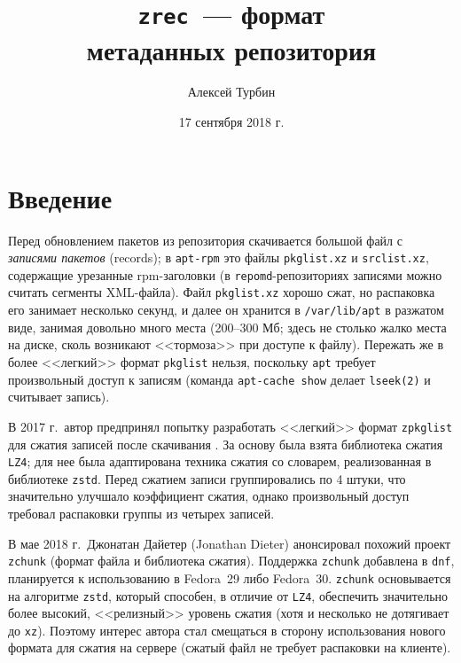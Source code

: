 \documentclass[russian,a4paper,12pt]{article}
\begin{document}
\title{\texttt{zrec}~--- формат\\метаданных репозитория}
\author{Алексей Турбин}
\date{17 сентября 2018 г.}
\maketitle

\begin{abstract}

\end{abstract}

\section{Введение}
Перед обновлением пакетов из репозитория скачивается большой файл с \textit{записями пакетов} (records);
в \verb|apt-rpm| это файлы \verb|pkglist.xz| и \verb|srclist.xz|, содержащие урезанные
rpm-заголовки (в \verb|repomd|-репозиториях записями можно считать сегменты XML-файла).
Файл \verb|pkglist.xz| хорошо сжат, но распаковка его занимает несколько секунд, и далее
он хранится в \verb|/var/lib/apt| в разжатом виде, занимая довольно много места (200--300 Мб;
здесь не столько жалко места на диске, сколь возникают <<тормоза>> при доступе к файлу).
Пережать же в более <<легкий>> формат \verb|pkglist| нельзя, поскольку \verb|apt| требует произвольный
доступ к записям (команда \texttt{apt-cache show} делает \verb|lseek(2)| и считывает запись).

В 2017 г.~автор предпринял попытку разработать <<легкий>> формат \verb|zpkglist|
для сжатия записей после скачивания \cite{zpkglist}.
За основу была взята библиотека сжатия \verb|LZ4|; для нее была адаптирована техника сжатия со словарем,
реализованная в библиотеке \verb|zstd|.  Перед сжатием записи группировались по 4 штуки, что значительно
улучшало коэффициент сжатия, однако произвольный доступ требовал распаковки группы из четырех записей.

В мае 2018 г.~Джонатан Дайетер (Jonathan Dieter) анонсировал похожий проект \verb|zchunk| \cite{dieter}
(формат файла и библиотека сжатия).  Поддержка \verb|zchunk| добавлена в \verb|dnf|, планируется к использованию
в Fedora~29 либо Fedora~30.  \verb|zchunk| основывается на алгоритме \verb|zstd|, который способен, в отличие от \verb|LZ4|,
обеспечить значительно более высокий, <<релизный>> уровень сжатия (хотя и несколько не дотягивает до \verb|xz|).
Поэтому интерес автора стал смещаться в сторону использования нового формата для сжатия на сервере (сжатый файл
не требует распаковки на клиенте).
\end{document}
